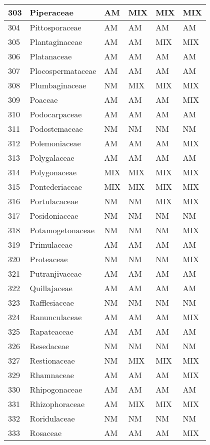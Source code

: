 \documentclass[]{article}
\begin{document}
\begin{longtable}{l|l|l|l|l|l}
303 & Piperaceae & AM & MIX & MIX & MIX\\
\hline
304 & Pittosporaceae & AM & AM & AM & AM\\
\hline
305 & Plantaginaceae & AM & AM & MIX & MIX\\
\hline
306 & Platanaceae & AM & AM & AM & AM\\
\hline
307 & Plocospermataceae & AM & AM & AM & AM\\
\hline
308 & Plumbaginaceae & NM & MIX & MIX & MIX\\
\hline
309 & Poaceae & AM & AM & AM & MIX\\
\hline
310 & Podocarpaceae & AM & AM & AM & AM\\
\hline
311 & Podostemaceae & NM & NM & NM & NM\\
\hline
312 & Polemoniaceae & AM & AM & AM & MIX\\
\hline
313 & Polygalaceae & AM & AM & AM & AM\\
\hline
314 & Polygonaceae & MIX & MIX & MIX & MIX\\
\hline
315 & Pontederiaceae & MIX & MIX & MIX & MIX\\
\hline
316 & Portulacaceae & NM & NM & MIX & MIX\\
\hline
317 & Posidoniaceae & NM & NM & NM & NM\\
\hline
318 & Potamogetonaceae & NM & NM & NM & MIX\\
\hline
319 & Primulaceae & AM & AM & AM & AM\\
\hline
320 & Proteaceae & NM & NM & NM & MIX\\
\hline
321 & Putranjivaceae & AM & AM & AM & AM\\
\hline
322 & Quillajaceae & AM & AM & AM & AM\\
\hline
323 & Rafflesiaceae & NM & NM & NM & NM\\
\hline
324 & Ranunculaceae & AM & AM & AM & MIX\\
\hline
325 & Rapateaceae & AM & AM & AM & AM\\
\hline
326 & Resedaceae & NM & NM & NM & NM\\
\hline
327 & Restionaceae & NM & MIX & MIX & MIX\\
\hline
329 & Rhamnaceae & AM & AM & AM & MIX\\
\hline
330 & Rhipogonaceae & AM & AM & AM & AM\\
\hline
331 & Rhizophoraceae & AM & MIX & MIX & MIX\\
\hline
332 & Roridulaceae & NM & NM & NM & NM\\
\hline
333 & Rosaceae & AM & AM & AM & MIX\\

\end{longtable}
\end{document}
